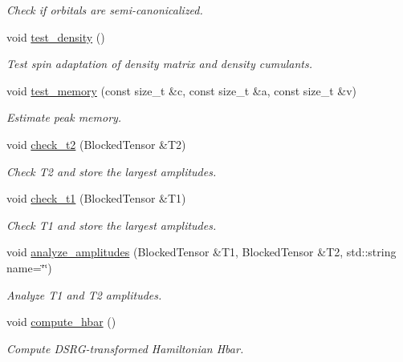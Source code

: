 \begin{DoxyCompactItemize}
\begin{DoxyCompactList}\small\item\em Check if orbitals are semi-\/canonicalized. \end{DoxyCompactList}\item 
void \mbox{\hyperlink{classforte_1_1_d_s_r_g___m_r_p_t_a3839be538e6d0cbc56172ac76a08c735}{test\+\_\+density}} ()
\begin{DoxyCompactList}\small\item\em Test spin adaptation of density matrix and density cumulants. \end{DoxyCompactList}\item 
void \mbox{\hyperlink{classforte_1_1_d_s_r_g___m_r_p_t_ac28549b2c6bd7f7bbeb8ecf70d5df3e1}{test\+\_\+memory}} (const size\+\_\+t \&c, const size\+\_\+t \&a, const size\+\_\+t \&v)
\begin{DoxyCompactList}\small\item\em Estimate peak memory. \end{DoxyCompactList}\item 
void \mbox{\hyperlink{classforte_1_1_d_s_r_g___m_r_p_t_ad86da153044ff2626e1ded1bd4041954}{check\+\_\+t2}} (Blocked\+Tensor \&T2)
\begin{DoxyCompactList}\small\item\em Check T2 and store the largest amplitudes. \end{DoxyCompactList}\item 
void \mbox{\hyperlink{classforte_1_1_d_s_r_g___m_r_p_t_a24fe22a35a7ac4c5a9a83361c5b6b750}{check\+\_\+t1}} (Blocked\+Tensor \&T1)
\begin{DoxyCompactList}\small\item\em Check T1 and store the largest amplitudes. \end{DoxyCompactList}\item 
void \mbox{\hyperlink{classforte_1_1_d_s_r_g___m_r_p_t_a7836c1b603be3a7b8383978865f42acf}{analyze\+\_\+amplitudes}} (Blocked\+Tensor \&T1, Blocked\+Tensor \&T2, std\+::string name=\char`\"{}\char`\"{})
\begin{DoxyCompactList}\small\item\em Analyze T1 and T2 amplitudes. \end{DoxyCompactList}\item 
void \mbox{\hyperlink{classforte_1_1_d_s_r_g___m_r_p_t_a2272dc6667027e7863e40f033f4bf741}{compute\+\_\+hbar}} ()
\begin{DoxyCompactList}\small\item\em Compute D\+S\+R\+G-\/transformed Hamiltonian Hbar. \end{DoxyCompactList}\item 

\end{DoxyCompactItemize}
